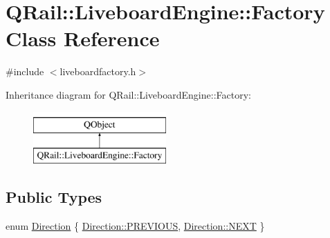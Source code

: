 \hypertarget{classQRail_1_1LiveboardEngine_1_1Factory}{}\section{Q\+Rail\+::Liveboard\+Engine\+::Factory Class Reference}
\label{classQRail_1_1LiveboardEngine_1_1Factory}


{\ttfamily \#include $<$liveboardfactory.\+h$>$}

Inheritance diagram for Q\+Rail\+::Liveboard\+Engine\+::Factory\+:\begin{figure}[H]
\begin{center}
\leavevmode
\includegraphics[height=2.000000cm]{classQRail_1_1LiveboardEngine_1_1Factory}
\end{center}
\end{figure}
\subsection*{Public Types}
\begin{DoxyCompactItemize}
\item 
enum \mbox{\hyperlink{classQRail_1_1LiveboardEngine_1_1Factory_a48dd4397653344eb07eb3212c2a188ba}{Direction}} \{ \mbox{\hyperlink{classQRail_1_1LiveboardEngine_1_1Factory_a48dd4397653344eb07eb3212c2a188baa315ba7a868d45a9cb131c8dca3166b51}{Direction\+::\+P\+R\+E\+V\+I\+O\+US}}, 
\mbox{\hyperlink{classQRail_1_1LiveboardEngine_1_1Factory_a48dd4397653344eb07eb3212c2a188baa47559fb833ff58321570e5e877b467f6}{Direction\+::\+N\+E\+XT}}
 \}
\end{DoxyCompactItemize}
